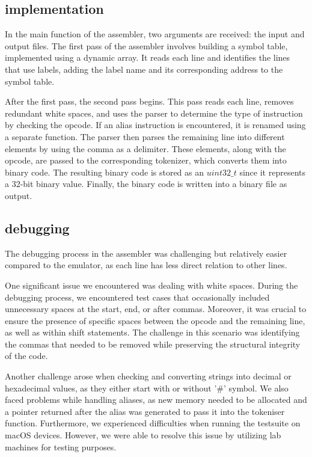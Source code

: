 \documentclass[11pt]{article}
\begin{document}
\subsection{implementation}
In the main function of the assembler, two arguments are received: the input and output files. The first pass of the assembler involves building a symbol table, implemented using a dynamic array. It reads each line and identifies the lines that use labels, adding the label name and its corresponding address to the symbol table.

After the first pass, the second pass begins. This pass reads each line, removes redundant white spaces, and uses the parser to determine the type of instruction by checking the opcode. If an alias instruction is encountered, it is renamed using a separate function. The parser then parses the remaining line into different elements by using the comma as a delimiter. These elements, along with the opcode, are passed to the corresponding tokenizer, which converts them into binary code.  The resulting binary code is stored as an $uint32\_t$ since it represents a 32-bit binary value. Finally, the binary code is written into a binary file as output.

\subsection{debugging}
The debugging process in the assembler was challenging but relatively easier compared to the emulator, as each line has less direct relation to other lines.

One significant issue we encountered was dealing with white spaces. During the debugging process, we encountered test cases that occasionally included unnecessary spaces at the start, end, or after commas. Moreover, it was crucial to ensure the presence of specific spaces between the opcode and the remaining line, as well as within shift statements. The challenge in this scenario was identifying the commas that needed to be removed while preserving the structural integrity of the code.

Another challenge arose when checking and converting strings into decimal or hexadecimal values, as they either start with or without '\#' symbol. We also faced problems while handling aliases, as new memory needed to be allocated and a pointer returned after the alias was generated to pass it into the tokeniser function. Furthermore, we experienced difficulties when running the testsuite on macOS devices. However, we were able to resolve this issue by utilizing lab machines for testing purposes.
\end{document}
